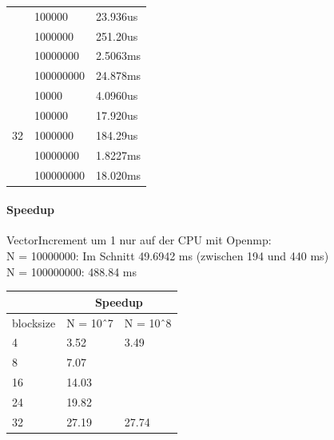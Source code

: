\documentclass{article}
\begin{document}
\begin{center}
\begin{tabular}{|c|l|l|}
		& 100000    & 23.936us                                                                                   \\ \cline{2-3} 
		& 1000000   & 251.20us                                                                                  \\ \cline{2-3} 
		& 10000000  & 2.5063ms                                                                                  \\ \cline{2-3} 
		& 100000000 & 24.878ms                                                                                 \\ \hline
		\multirow{5}{*}{32}             & 10000     & 4.0960us                                                                                   \\ \cline{2-3} 
		& 100000    & 17.920us                                                                                   \\ \cline{2-3} 
		& 1000000   & 184.29us                                                                                   \\ \cline{2-3} 
		& 10000000  & 1.8227ms                                                                                   \\ \cline{2-3} 
		& 100000000 & 18.020ms                                                                                  \\ \hline
	\end{tabular}
\end{center}

\paragraph{Speedup} 
VectorIncrement um 1 nur auf der CPU mit Openmp:\\
N = 10000000:  Im Schnitt 49.6942 ms (zwischen 194 und 440 ms)\\
N = 100000000: 488.84 ms

\begin{center}
	\begin{tabular}{l|l|l|}
		\cline{2-3}
		& \multicolumn{2}{c|}{Speedup} \\ \hline
		\multicolumn{1}{|l|}{blocksize} & N = 10ˆ7      & N = 10ˆ8     \\ \hline
		\multicolumn{1}{|l|}{4}         & 3.52          & 3.49         \\ \hline
		\multicolumn{1}{|l|}{8}         & 7.07          &              \\ \hline
		\multicolumn{1}{|l|}{16}        & 14.03         &              \\ \hline
		\multicolumn{1}{|l|}{24}        & 19.82         &              \\ \hline
		\multicolumn{1}{|l|}{32}        & 27.19         & 27.74        \\ \hline
	\end{tabular}
\end{center}
\end{document}
